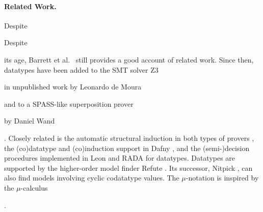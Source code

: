 


\begin{rep}\paragraph{Related Work.} Despite\end{rep}%
\begin{conf}Despite\end{conf} its age,
Barrett et al.\ \cite{barrett-et-al-2007} still provides a good account of
related work. Since then, datatypes have been added to the SMT solver
Z3 \cite{de-moura-bjoerner-2008} \begin{rep}in unpublished work by Leonardo de Moura \end{rep}and to a SPASS-like %
superposition prover \begin{rep}by Daniel Wand\end{rep} \cite{wand-2014}.
Closely related is the automatic structural
induction in both types of provers \cite{kersani-peltier-2013,cruanes-201x,wand-weidenbach-201x,reynolds-kuncak-2015},
the (co)datatype and (co)induction support in Dafny \cite{leino-moskal-2014},
and the (semi-)decision procedures implemented in Leon \cite{suter-et-al-2011} and RADA \cite{pham-et-al-2013}
for datatypes.
%
Datatypes are supported by the higher-order model finder Refute
\cite{weber-2008}. Its successor, Nitpick \cite{blanchette-nipkow-2010}, can
also find models involving cyclic codatatype values. The $\mu$-notation is
inspired by the $\mu$-calculus
\begin{conf}\cite{kozen-1983}\end{conf}%
\begin{rep}\cite[etc.]{kozen-1983,endrullis-et-al-2011}\end{rep}%
.


